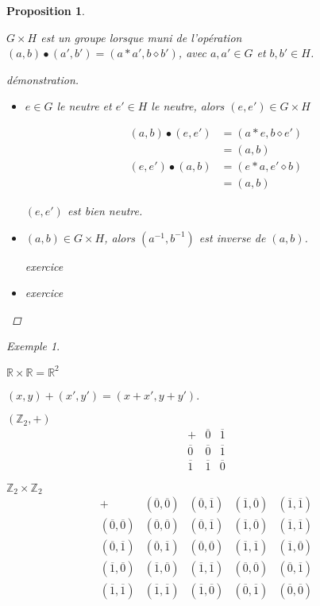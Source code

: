 \documentclass{report}
\newcommand*{\reels}{\mathbb{R}}
\newcommand*{\entiers}{\mathbb{Z}}
\newtheorem*{prop}{Proposition}
\theoremstyle{definition}
\theoremstyle{remark}
\newtheorem*{exem}{Exemple}
\begin{document}
	\begin{prop}
		~

		$G \times H$ est un groupe lorsque muni de l'op\'eration $(a,b) \bullet (a',b') = (a*a',b \diamond b')$, avec $a,a' \in G$ et $b,b' \in H$.
		\begin{proof}[d\'emonstration]~

			\begin{itemize}
				\item[(N)] $e \in G$ le neutre et $e' \in H$ le neutre, alors $(e,e') \in G \times H$

				\begin{align*}
					(a,b) \bullet (e,e')&= (a*e, b \diamond e')\\
					&= (a,b)\\
					(e,e') \bullet (a,b)&= (e*a, e' \diamond b)\\
					&= (a,b)
				\end{align*}

				$(e,e')$ est bien neutre.
				\item[(I)] $(a,b) \in G \times H$, alors $(a^{-1},b^{-1})$ est inverse de $(a,b)$.

				exercice
				\item[(A)] exercice
			\end{itemize}
		\end{proof}
	\end{prop}
	\begin{exem}
		\begin{ulist}
			\item $\reels \times \reels = \reels^2$

			$(x,y)+(x',y')=(x+x',y+y')$.
			\item $(\entiers_2,+)$
			\renewcommand{\arraystretch}{1.5}
			\[
			\begin{array}{c||c|c}
				+&\overline0&\overline1\\
				\hline\hline
				\overline0&\overline0&\overline1\\
				\hline
				\overline1&\overline1&\overline0
			\end{array}
			\]

			$\entiers_2 \times \entiers_2$
			\[
			\begin{array}{c||c|c|c|c}
				+&(\overline0,\overline0)& (\overline0,\overline1)& (\overline1,\overline0)& (\overline1,\overline1)\\
				\hline\hline
				(\overline0,\overline0)& (\overline0,\overline0)& (\overline0,\overline1)& (\overline1,\overline0)& (\overline1,\overline1)\\
				\hline
				(\overline0,\overline1)& (\overline0,\overline1)& (\overline0,\overline0)& (\overline1,\overline1)& (\overline1,\overline0)\\
				\hline
				(\overline1,\overline0)& (\overline1,\overline0)& (\overline1,\overline1)& (\overline0,\overline0)& (\overline0,\overline1)\\
				\hline
				(\overline1,\overline1)& (\overline1,\overline1)& (\overline1,\overline0)& (\overline0,\overline1)& (\overline0,\overline0)
			\end{array}
			\]
			\renewcommand{\arraystretch}{1}
		\end{ulist}
	\end{exem}
\end{document}
